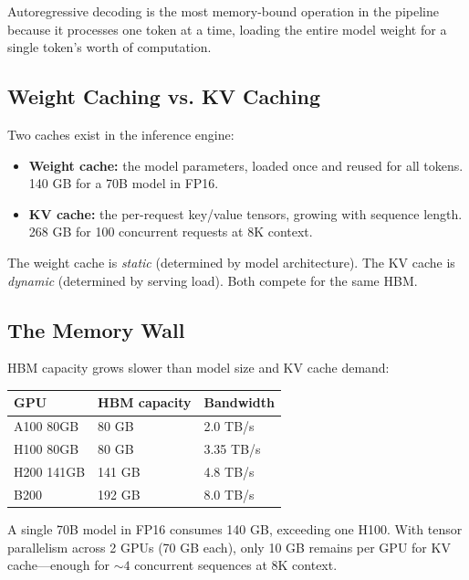 \documentclass[11pt,a4paper]{article}
\theoremstyle{definition}
\begin{document}
Autoregressive decoding is the most memory-bound operation in the pipeline because it processes one token at a time, loading the entire model weight for a single token's worth of computation.

\subsection{Weight Caching vs. KV Caching}

Two caches exist in the inference engine:

\begin{itemize}
	\item \textbf{Weight cache:} the model parameters, loaded once and reused for all tokens. 140 GB for a 70B model in FP16.
	\item \textbf{KV cache:} the per-request key/value tensors, growing with sequence length. 268 GB for 100 concurrent requests at 8K context.
\end{itemize}

The weight cache is \emph{static} (determined by model architecture). The KV cache is \emph{dynamic} (determined by serving load). Both compete for the same HBM.

\subsection{The Memory Wall}

HBM capacity grows slower than model size and KV cache demand:

\begin{center}
	\begin{tabular}{lll}
		\toprule
		\textbf{GPU} & \textbf{HBM capacity} & \textbf{Bandwidth} \\
		\midrule
		A100 80GB    & 80 GB                 & 2.0 TB/s           \\
		H100 80GB    & 80 GB                 & 3.35 TB/s          \\
		H200 141GB   & 141 GB                & 4.8 TB/s           \\
		B200         & 192 GB                & 8.0 TB/s           \\
		\bottomrule
	\end{tabular}
\end{center}

A single 70B model in FP16 consumes 140 GB, exceeding one H100. With tensor parallelism across 2 GPUs (70 GB each), only 10 GB remains per GPU for KV cache---enough for $\sim 4$ concurrent sequences at 8K context.
\end{document}
